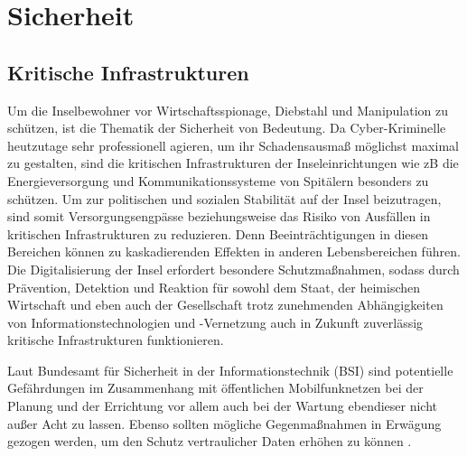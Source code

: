 
%
%
% 
% 
% 

\section{Sicherheit}
\label{sec:sicherheit}
\subsection{Kritische Infrastrukturen}
Um die Inselbewohner vor Wirtschaftsspionage, Diebstahl und Manipulation zu schützen, ist die Thematik der Sicherheit von Bedeutung. Da Cyber-Kriminelle heutzutage sehr professionell agieren, um ihr Schadensausmaß möglichst maximal zu gestalten, sind die kritischen Infrastrukturen der Inseleinrichtungen wie zB die Energieversorgung und Kommunikationssysteme von Spitälern besonders zu schützen. Um zur politischen und sozialen Stabilität auf der Insel beizutragen, sind somit Versorgungsengpässe beziehungsweise das Risiko von Ausfällen in kritischen Infrastrukturen zu reduzieren. Denn Beeinträchtigungen in diesen Bereichen können zu kaskadierenden Effekten in anderen Lebensbereichen führen. Die Digitalisierung der Insel erfordert besondere Schutzmaßnahmen, sodass durch Prävention, Detektion und Reaktion für sowohl dem Staat, der heimischen Wirtschaft und eben auch der Gesellschaft trotz zunehmenden Abhängigkeiten von Informationstechnologien und -Vernetzung auch in Zukunft zuverlässig kritische Infrastrukturen funktionieren\cite{BSI17}.

Laut Bundesamt für Sicherheit in der Informationstechnik (BSI) sind potentielle Gefährdungen im Zusammenhang mit öffentlichen Mobilfunknetzen bei der Planung und der Errichtung vor allem auch bei der Wartung ebendieser nicht außer Acht zu lassen. Ebenso sollten mögliche Gegenmaßnahmen in Erwägung gezogen werden, um den Schutz vertraulicher Daten erhöhen zu können \cite{Ger08}.
